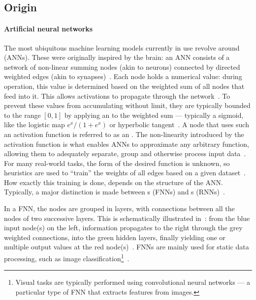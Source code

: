 \subsection{Origin}
\paragraph{Artificial neural networks}
The most ubiquitous machine learning models currently in use revolve around  (ANNs).
These were originally inspired by the brain: an ANN consists of a network of non-linear summing nodes (akin to neurons) connected by directed weighted edges (akin to synapses)~\cite{EvaluatingRestrictedESNs,zurada1992introduction,AIsimulateMemoryContinuity}.
Each node holds a numerical value: during operation, this value is determined based on the weighted sum of all nodes that feed into it.
This allows activations to propagate through the network~\cite{lukovsevivcius2009reservoir}.
To prevent these values from accumulating without limit, they are typically bounded to the range $[0,1]$ by applying an  to the weighted sum --- typically a sigmoid, like the logistic map $e^x/(1+e^x)$ or hyperbolic tangent~\cite{SurveyUniversalApproximation}.
A node that uses such an activation function is referred to as an .
The non-linearity introduced by the activation function is what enables ANNs to approximate any arbitrary function, allowing them to adequately separate, group and otherwise process input data~\cite{ApproximationFNN,SurveyUniversalApproximation,funahashi1992neural}.
For many real-world tasks, the form of the desired function is unknown, so heuristics are used to ``train'' the weights of all edges based on a given dataset~\cite{EvaluatingRestrictedESNs}.
How exactly this training is done, depends on the structure of the ANN.
Typically, a major distinction is made between s (FNNs) and s (RNNs)~\cite{ApproximationRNN}. \par
In a FNN, the nodes are grouped in layers, with connections between all the nodes of two successive layers.
This is schematically illustrated in~: from the blue input node(s) on the left, information propagates to the right through the grey weighted connections, into the green hidden layers, finally yielding one or multiple output values at the red node(s)~\cite{zurada1992introduction}.
FNNs are mainly used for static data processing, such as image classification\footnote{Visual tasks are typically performed using convolutional neural networks --- a particular type of FNN that extracts features from images.}~\cite{ApproximationRNN}.
